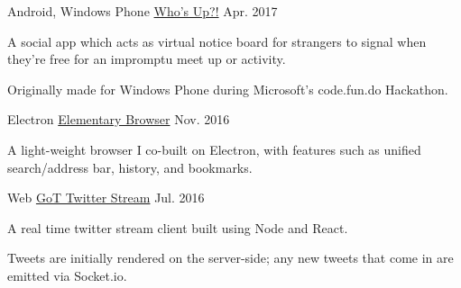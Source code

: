 

\begin{cventries}

  \cventry
    {Android, Windows Phone} %
    {\href{https://github.com/Whos-Up-Team/WhosUp}{Who's Up?!}} %
    {} %
    {Apr. 2017} %
    {
      \begin{cvitems} %
        \item {A social app which acts as virtual notice board for strangers to signal when they're free for an impromptu meet up or activity.}
		\item {Originally made for Windows Phone during Microsoft's code.fun.do Hackathon.}
      \end{cvitems}
    }

  \cventry
    {Electron} %
    {\href{https://github.com/azwreith/elementary-browser}{Elementary Browser}} %
    {} %
    {Nov. 2016} %
    {
      \begin{cvitems} %
        \item {A light-weight browser I co-built on Electron, with features such as unified search/address bar, history, and bookmarks.}
      \end{cvitems}
    }

  \cventry
    {Web} %
    {\href{https://github.com/azwreith/got-twitter-stream}{GoT Twitter Stream}} %
    {} %
    {Jul. 2016} %
    {
      \begin{cvitems} %
        \item {A real time twitter stream client built using Node and React.}
        \item {Tweets are initially rendered on the server-side; any new tweets that come in are emitted via Socket.io.}
      \end{cvitems}
    }

\end{cventries}
